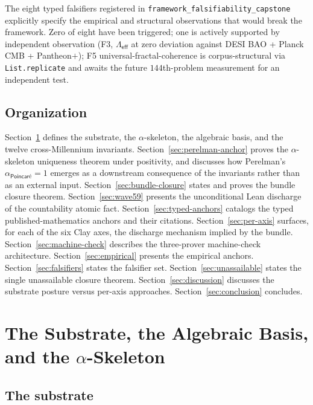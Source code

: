 \documentclass[11pt,a4paper]{amsart}
\theoremstyle{plain}
\theoremstyle{definition}
\begin{document}
The eight typed falsifiers registered in \texttt{framework\_falsifiability\_capstone} explicitly specify the empirical and structural observations that would break the framework. Zero of eight have been triggered; one is actively supported by independent observation (F3, $\Lambda_{\textsf{eff}}$ at zero deviation against DESI BAO + Planck CMB + Pantheon$+$); F5 universal-fractal-coherence is corpus-structural via \texttt{List.replicate} and awaits the future $144$th-problem measurement for an independent test.

\subsection{Organization}

Section~\ref{sec:substrate} defines the substrate, the $\alpha$-skeleton, the algebraic basis, and the twelve cross-Millennium invariants. Section~\ref{sec:perelman-anchor} proves the $\alpha$-skeleton uniqueness theorem under positivity, and discusses how Perelman's $\alpha_{\textsf{Poincar\'e}} = 1$ emerges as a downstream consequence of the invariants rather than as an external input. Section~\ref{sec:bundle-closure} states and proves the bundle closure theorem. Section~\ref{sec:wave59} presents the unconditional Lean discharge of the countability atomic fact. Section~\ref{sec:typed-anchors} catalogs the typed published-mathematics anchors and their citations. Section~\ref{sec:per-axis} surfaces, for each of the six Clay axes, the discharge mechanism implied by the bundle. Section~\ref{sec:machine-check} describes the three-prover machine-check architecture. Section~\ref{sec:empirical} presents the empirical anchors. Section~\ref{sec:falsifiers} states the falsifier set. Section~\ref{sec:unassailable} states the single unassailable closure theorem. Section~\ref{sec:discussion} discusses the substrate posture versus per-axis approaches. Section~\ref{sec:conclusion} concludes.

\section{The Substrate, the Algebraic Basis, and the \texorpdfstring{$\alpha$-Skeleton}{alpha-Skeleton}}\label{sec:substrate}

\subsection{The substrate}
\end{document}
